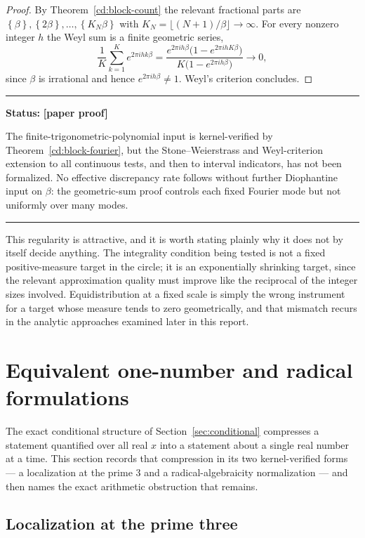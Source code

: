 \documentclass[11pt,oneside]{article}
\theoremstyle{definition}
\theoremstyle{remark}
\newcommand{\fract}[1]{\left\{#1\right\}}
\newcommand{\statusnew}{\textcolor{newgreen}{\textbf{[paper proof]}}}
\newenvironment{statusbox}[1]
{\begin{center}\begin{minipage}{0.94\textwidth}\raggedright\hbadness=10000\hrule
\vspace{0.45em}\textbf{Status:} #1\par\vspace{0.35em}}
{\vspace{0.35em}\hrule\end{minipage}\end{center}}
\begin{document}
\begin{proof}
By Theorem~\ref{cd:block-count} the relevant fractional parts are
$\fract{\beta},\fract{2\beta},\dots,\fract{K_N\beta}$ with $K_N=\lfloor(N+1)/\beta\rfloor\to
\infty$.  For every nonzero integer $h$ the Weyl sum is a finite geometric series,
\[
\frac1K\sum_{k=1}^{K}e^{2\pi ihk\beta}
=\frac{e^{2\pi ih\beta}\bigl(1-e^{2\pi ihK\beta}\bigr)}{K\bigl(1-e^{2\pi ih\beta}\bigr)}
\longrightarrow0,
\]
since $\beta$ is irrational and hence $e^{2\pi ih\beta}\ne1$.  Weyl's criterion concludes.
\end{proof}

\begin{statusbox}{\statusnew{}}
The finite-trigonometric-polynomial input is kernel-verified by
Theorem~\ref{cd:block-fourier}, but the Stone--Weierstrass and Weyl-criterion extension to all
continuous tests, and then to interval indicators, has not been formalized.  No effective
discrepancy rate follows without further Diophantine input on $\beta$: the geometric-sum proof
controls each fixed Fourier mode but not uniformly over many modes.
\end{statusbox}

This regularity is attractive, and it is worth stating plainly why it does not by itself decide
anything.  The integrality condition being tested is not a fixed positive-measure target in the
circle; it is an exponentially shrinking target, since the relevant approximation quality must
improve like the reciprocal of the integer sizes involved.  Equidistribution at a fixed scale is
simply the wrong instrument for a target whose measure tends to zero geometrically, and that
mismatch recurs in the analytic approaches examined later in this report.
\section{Equivalent one-number and radical formulations}
\label{sec:radical}

The exact conditional structure of Section~\ref{sec:conditional} compresses a statement
quantified over all real $x$ into a statement about a single real number at a time.  This
section records that compression in its two kernel-verified forms --- a localization at the
prime $3$ and a radical-algebraicity normalization --- and then names the exact arithmetic
obstruction that remains.

\subsection{Localization at the prime three}
\end{document}
